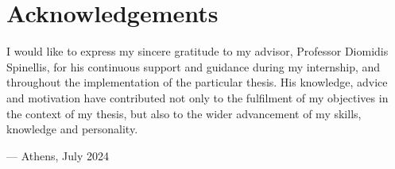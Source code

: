 \chapter*{\centering Acknowledgements}
\label{ch:acknowledgements}

I would like to express my sincere gratitude to my advisor, Professor Diomidis
Spinellis, for his continuous support and guidance during my internship, and
throughout the implementation of the particular thesis. His knowledge, advice
and motivation have contributed not only to the fulfilment of my objectives in
the context of my thesis, but also to the wider advancement of my skills,
knowledge and personality.

\vspace{1cm}

\hfill --- Athens, July 2024
